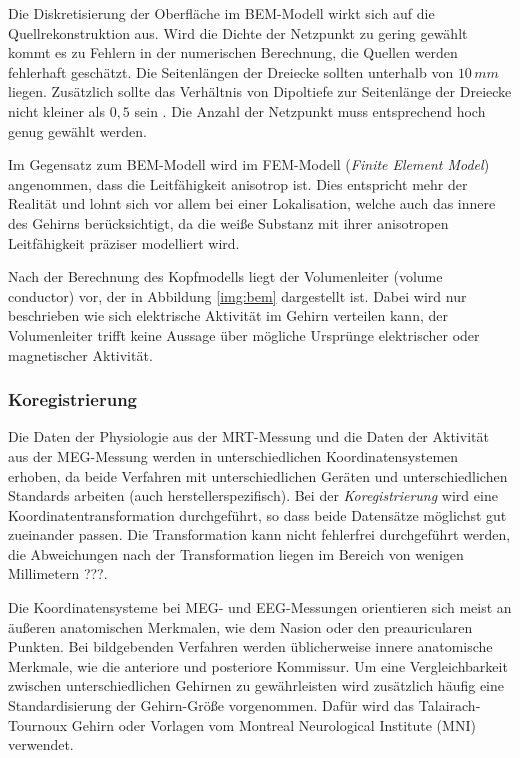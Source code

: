 \documentclass[doc,a4paper,12pt]{apa6}
\begin{document}
Die Diskretisierung der Oberfläche im BEM-Modell wirkt sich auf die Quellrekonstruktion aus. Wird die Dichte der Netzpunkt zu gering gewählt kommt es zu Fehlern in der numerischen Berechnung, die Quellen werden fehlerhaft geschätzt. Die Seitenlängen der Dreiecke sollten unterhalb von $10\,mm$ liegen. Zusätzlich sollte das Verhältnis von Dipoltiefe zur Seitenlänge der Dreiecke nicht kleiner als $0,5$ sein \parencite{haueisen1997effect}. Die Anzahl der Netzpunkt muss entsprechend hoch genug gewählt werden.

Im Gegensatz zum BEM-Modell wird im FEM-Modell (\emph{Finite Element Model}) angenommen, dass die Leitfähigkeit anisotrop ist. Dies entspricht mehr der Realität und lohnt sich vor allem bei einer Lokalisation, welche auch das innere des Gehirns berücksichtigt, da die weiße Substanz mit ihrer anisotropen Leitfähigkeit präziser modelliert wird.

Nach der Berechnung des Kopfmodells liegt der Volumenleiter (volume conductor) vor, der in Abbildung \ref{img:bem} dargestellt ist. Dabei wird nur beschrieben wie sich elektrische Aktivität im Gehirn verteilen kann, der Volumenleiter trifft keine Aussage über mögliche Ursprünge elektrischer oder magnetischer Aktivität.

\subsubsection{Koregistrierung}

Die Daten der Physiologie aus der MRT-Messung und die Daten der Aktivität aus der MEG-Messung werden in unterschiedlichen Koordinatensystemen erhoben, da beide Verfahren mit unterschiedlichen Geräten und unterschiedlichen Standards arbeiten (auch herstellerspezifisch). Bei der \emph{Koregistrierung} wird eine Koordinatentransformation durchgeführt, so dass beide Datensätze möglichst gut zueinander passen. Die Transformation kann nicht fehlerfrei durchgeführt werden, die Abweichungen nach der Transformation liegen im Bereich von wenigen Millimetern ???.

Die Koordinatensysteme bei MEG- und EEG-Messungen orientieren sich meist an äußeren anatomischen Merkmalen, wie dem Nasion oder den preauricularen Punkten. Bei bildgebenden Verfahren werden üblicherweise innere anatomische Merkmale, wie die anteriore und posteriore Kommissur. Um eine Vergleichbarkeit zwischen unterschiedlichen Gehirnen zu gewährleisten wird zusätzlich häufig eine Standardisierung der Gehirn-Größe vorgenommen. Dafür wird das Talairach-Tournoux Gehirn oder Vorlagen vom Montreal Neurological Institute (MNI) verwendet.
\end{document}
